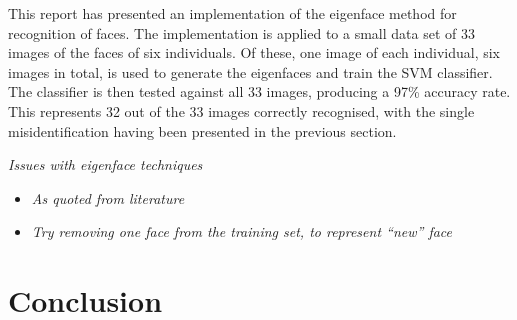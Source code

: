 This report has presented an implementation of the eigenface method for recognition of faces. The implementation is applied to a small data set of 33 images of the faces of six individuals. Of these, one image of each individual, six images in total, is used to generate the eigenfaces and train the SVM classifier. The classifier is then tested against all 33 images, producing a 97\% accuracy rate. This represents 32 out of the 33 images correctly recognised, with the single misidentification having been presented in the previous section.

\textit{Issues with eigenface techniques}
\begin{itemize}
  \item \textit{As quoted from literature}
  \item \textit{Try removing one face from the training set, to represent ``new'' face}
\end{itemize}

\section{Conclusion}
